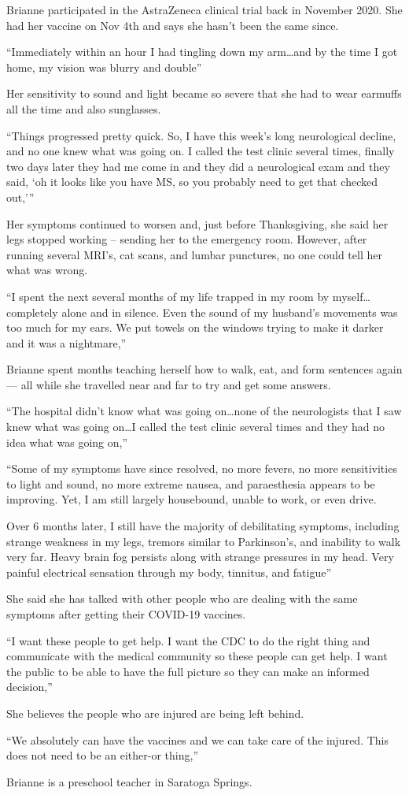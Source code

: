 Brianne participated in the AstraZeneca clinical trial back in November
2020. She had her vaccine on Nov 4th and says she hasn’t been the same since.

“Immediately within an hour I had tingling down my arm…and by the time I got
home, my vision was blurry and double”

Her sensitivity to sound and light became so severe that she had to wear
earmuffs all the time and also sunglasses.

“Things progressed pretty quick. So, I have this week’s long neurological
decline, and no one knew what was going on. I called the test clinic several
times, finally two days later they had me come in and they did a neurological
exam and they said, ‘oh it looks like you have MS, so you probably need to get
that checked out,’”

Her symptoms continued to worsen and, just before Thanksgiving, she said her
legs stopped working – sending her to the emergency room. However, after running
several MRI’s, cat scans, and lumbar punctures, no one could tell her what was
wrong.

“I spent the next several months of my life trapped in my room by
myself…completely alone and in silence. Even the sound of my husband’s movements
was too much for my ears. We put towels on the windows trying to make it darker
and it was a nightmare,”

Brianne spent months teaching herself how to walk, eat, and form sentences again
— all while she travelled near and far to try and get some answers.

“The hospital didn’t know what was going on…none of the neurologists that I saw
knew what was going on…I called the test clinic several times and they had no
idea what was going on,”

“Some of my symptoms have since resolved, no more fevers, no more sensitivities
to light and sound, no more extreme nausea, and paraesthesia appears to be
improving. Yet, I am still largely housebound, unable to work, or even drive.

Over 6 months later, I still have the majority of debilitating symptoms,
including strange weakness in my legs, tremors similar to Parkinson’s, and
inability to walk very far. Heavy brain fog persists along with strange
pressures in my head. Very painful electrical sensation through my body,
tinnitus, and fatigue”

She said she has talked with other people who are dealing with the same symptoms
after getting their COVID-19 vaccines.

“I want these people to get help. I want the CDC to do the right thing and
communicate with the medical community so these people can get help. I want the
public to be able to have the full picture so they can make an informed
decision,”

She believes the people who are injured are being left behind.

“We absolutely can have the vaccines and we can take care of the injured. This
does not need to be an either-or thing,”

Brianne is a preschool teacher in Saratoga Springs.

